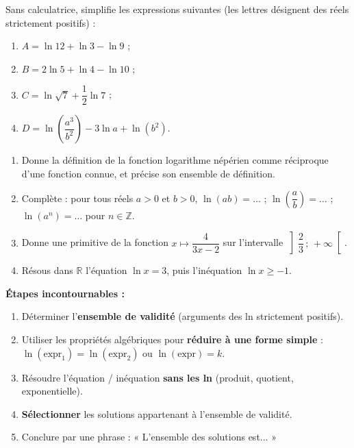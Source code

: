 \documentclass[11pt]{article}
\newcounter{popsec}
\newcounter{popsub}
\newcommand{\courssub}[1]{%
  \stepcounter{popsub}%
  \par\vspace{9pt}\noindent{\popxbold\fontsize{11.5}{13}\selectfont\color{popink}{\color{poporange}\thepopsec.\thepopsub}\hspace{6pt}#1}\par\nopagebreak\vspace{4pt}
}
\begin{document}
\begin{exercice}
Sans calculatrice, simplifie les expressions suivantes (les lettres désignent des réels strictement positifs) :
\begin{enumerate}
\item $A = \ln 12 + \ln 3 - \ln 9$ ;
\item $B = 2\ln 5 + \ln 4 - \ln 10$ ;
\item $C = \ln \sqrt{7} + \dfrac{1}{2}\ln 7$ ;
\item $D = \ln\left(\dfrac{a^3}{b^2}\right) - 3\ln a + \ln(b^2)$.
\end{enumerate}
\end{exercice}

\begin{exercice}
\begin{enumerate}
\item Donne la définition de la fonction logarithme népérien comme réciproque d'une fonction connue, et précise son ensemble de définition.
\item Complète : pour tous réels $a > 0$ et $b > 0$, $\ln(ab) = \ldots$ ; $\ln\left(\dfrac{a}{b}\right) = \ldots$ ; $\ln(a^n) = \ldots$ pour $n \in \mathbb{Z}$.
\item Donne une primitive de la fonction $x \longmapsto \dfrac{4}{3x-2}$ sur l'intervalle $\left]\dfrac{2}{3}\,;\,+\infty\right[$.
\item Résous dans $\mathbb{R}$ l'équation $\ln x = 3$, puis l'inéquation $\ln x \geq -1$.
\end{enumerate}
\end{exercice}

\courssub{Je m'entraîne}

\begin{methode}
\textbf{Étapes incontournables :}
\begin{enumerate}
\item Déterminer l'\textbf{ensemble de validité} (arguments des ln strictement positifs).
\item Utiliser les propriétés algébriques pour \textbf{réduire à une forme simple} : $\ln(\text{expr}_1) = \ln(\text{expr}_2)$ ou $\ln(\text{expr}) = k$.
\item Résoudre l'équation / inéquation \textbf{sans les ln} (produit, quotient, exponentielle).
\item \textbf{Sélectionner} les solutions appartenant à l'ensemble de validité.
\item Conclure par une phrase : « L'ensemble des solutions est... »
\end{enumerate}
\end{methode}
\end{document}
